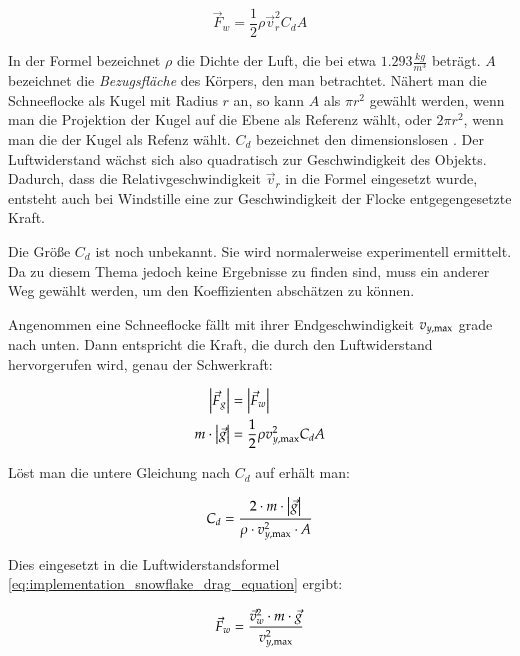 \begin{equation}
\label{eq:implementation_snowflake_drag_equation}
\vec{F}_w = \frac{1}{2} \rho \vec{v}_r^2 C_d A
\end{equation}

In der Formel bezeichnet $\rho$ die Dichte der Luft, die bei
 etwa $1.293\frac{kg}{m^3}$ beträgt. $A$ bezeichnet
die \emph{Bezugsfläche} des Körpers, den man betrachtet. Nähert man
die Schneeflocke als Kugel mit Radius $r$ an, so kann $A$ als $\pi
r^2$ gewählt werden, wenn man die Projektion der Kugel auf die Ebene
als Referenz wählt, oder $2\pi r^2$, wenn man die
 der Kugel als Refenz wählt. $C_d$
bezeichnet den dimensionslosen
. Der Luftwiderstand
wächst sich also quadratisch zur Geschwindigkeit des Objekts. Dadurch,
dass die Relativgeschwindigkeit $\vec{v}_r$ in die Formel eingesetzt
wurde, entsteht auch bei Windstille eine zur Geschwindigkeit der
Flocke entgegengesetzte Kraft.

Die Größe $C_d$ ist noch unbekannt. Sie wird normalerweise
experimentell ermittelt. Da zu diesem Thema jedoch keine Ergebnisse zu
finden sind, muss ein anderer Weg gewählt werden, um den Koeffizienten
abschätzen zu können.

Angenommen eine Schneeflocke fällt mit ihrer Endgeschwindigkeit
$v_{y,\textnormal{max}}$ grade nach unten. Dann
entspricht die Kraft, die durch den Luftwiderstand hervorgerufen wird,
genau der Schwerkraft:

\begin{align}
\left|\vec{F}_g\right| &= \left|\vec{F}_w\right| \\
m \cdot \left|\vec{g}\right| &= \frac{1}{2} \rho v_{y,\textnormal{max}}^2 C_d A
\end{align}

Löst man die untere Gleichung nach $C_d$ auf erhält man:

\begin{equation}
C_d
=
\frac
{
  2 \cdot m \cdot \left|\vec{g}\right|
}
{
  \rho \cdot v_{y,\textnormal{max}}^2 \cdot A
}
\end{equation}

Dies eingesetzt in die Luftwiderstandsformel
\ref{eq:implementation_snowflake_drag_equation} ergibt:

\begin{equation}
\vec{F}_w =
\frac
{
  \vec{v}_w^2 \cdot m \cdot \vec{g}
}
{
  v_{y,\textnormal{max}}^2
}
\end{equation}

